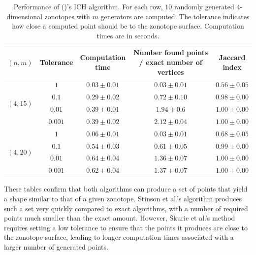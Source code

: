 \begin{table}[!ht]
    \centering
    \begin{tabular}{|c|c|c|c|c|}
    \hline
    $(n,m)$ & Tolerance & \makecell{Computation \\ time} & \makecell{Number found points \\ / exact number of vertices} & \makecell{Jaccard \\ index} \\
    \hline
    \hline

    \multirow{ 4}{*}{$(4,15)$} & $1$ & $0.03\pm 0.01$ & $0.03\pm 0.01$ & $0.56\pm 0.05$  \\
    \cline{2-5}
    & $0.1$ & $0.29\pm 0.02$ & $0.72\pm 0.10$ & $0.98\pm 0.00$ \\
    \cline{2-5}
    & $0.01$ & $0.39\pm 0.01$ & $1.94\pm 0
    .6$ & $\mathbf{1.00\pm 0.00}$\\
    \cline{2-5}
    & $0.001$ & $0.39\pm 0.02$ & $2.12\pm 0.04$ & $\mathbf{1.00\pm 0.00}$ \\
    \hline
    \multirow{ 4}{*}{$(4,20)$}& $1$ & $0.06\pm 0.01$ & $0.03\pm 0.01$ & $0.68\pm 0.05$ \\
    \cline{2-5}
    & $0.1$ & $0.54\pm 0.03$ & $0.61\pm 0.05$ & $0.99\pm 0.00$ \\
    \cline{2-5}
    & $0.01$ & $0.64\pm 0.04$ & $1.36\pm 0.07$ & $\mathbf{1.00\pm 0.00}$ \\
    \cline{2-5}
    & $0.001$ & $0.62\pm 0.04$ & $1.37\pm 0.07$ & $\mathbf{1.00\pm 0.00}$ \\
    \hline
    \end{tabular}
    \caption{Performance of (\cite{skuricOnLineFeasibleWrench2022})'s ICH algorithm. For each row, $10$ randomly generated $4$-dimensional zonotopes with $m$ generators are computed. The tolerance indicates how close a computed point should be to the zonotope surface. Computation times are in seconds.}
    \label{tab:approx_vertex_set_ich}
\end{table}

These tables confirm that both algorithms can produce a set of points that yield a shape similar to that of a given zonotope. Stinson et al.'s algorithm produces such a set very quickly compared to exact algorithms, with a number of required points much smaller than the exact amount. However, Škuric et al.'s method requires setting a low tolerance to ensure that the points it produces are close to the zonotope surface, leading to longer computation times associated with a larger number of generated points. 

